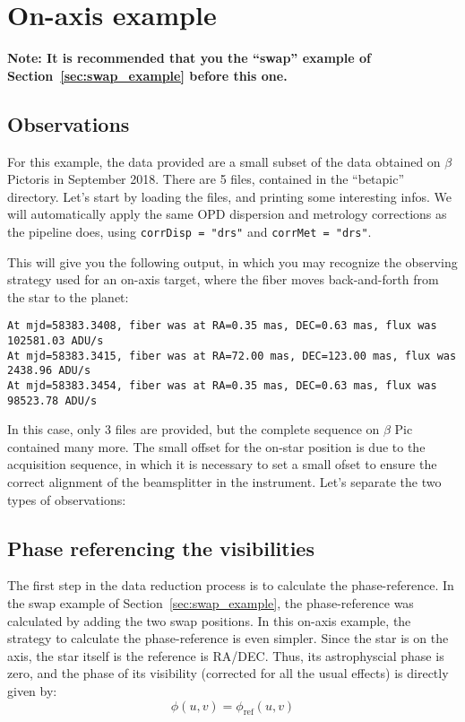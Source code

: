 \section{On-axis example}

\textbf{Note: It is recommended that you the ``swap'' example of Section~\ref{sec:swap_example} before this one.}

\subsection{Observations}

For this example, the data provided are a small subset of the data obtained on $\beta$ Pictoris in September 2018. There are 5 files, contained in the ``betapic'' directory. Let's start by loading the files, and printing some interesting infos. We will automatically apply the same OPD dispersion and metrology corrections as the pipeline does, using \verb|corrDisp = "drs"| and \verb|corrMet = "drs"|.


\noindent{}This will give you the following output, in which you may recognize the observing strategy used for an on-axis target, where the fiber moves back-and-forth from the star to the planet:
\begin{verbatim}
At mjd=58383.3408, fiber was at RA=0.35 mas, DEC=0.63 mas, flux was 102581.03 ADU/s
At mjd=58383.3415, fiber was at RA=72.00 mas, DEC=123.00 mas, flux was 2438.96 ADU/s
At mjd=58383.3454, fiber was at RA=0.35 mas, DEC=0.63 mas, flux was 98523.78 ADU/s
\end{verbatim}

\noindent{}In this case, only 3 files are provided, but the complete sequence on $\beta$ Pic contained many more. The small offset for the on-star position is due to the acquisition sequence, in which it is necessary to set a small ofset to ensure the correct alignment of the beamsplitter in the instrument. Let's separate the two types of observations:


\subsection{Phase referencing the visibilities}

The first step in the data reduction process is to calculate the phase-reference. In the swap example of Section~\ref{sec:swap_example}, the phase-reference was calculated by adding the two swap positions. In this on-axis example, the strategy to calculate the phase-reference is even simpler. Since the star is on the axis, the star itself is the reference is RA/DEC. Thus, its astrophyscial phase is zero, and the phase of its visibility (corrected for all the usual effects) is directly given by:
\begin{equation*}
\phi(u, v) = \phi_\mathrm{ref}(u, v)
\end{equation*}

